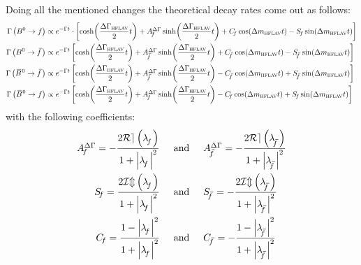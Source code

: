Doing all the mentioned changes the theoretical decay rates come out as follows:
\begin{align}
  \Gamma\left(\Bz\to f\right) &\propto e^{-\Gamma t} \cdot \left[
  \cosh\!\left(\frac{\DG_{\scaleto{\text{HFLAV}}{4pt}}}{2}t\right)+\ADGf\sinh\!\left(\frac{\DG_{\scaleto{\text{HFLAV}}{4pt}}}{2}t\right)
  +\Cf\cos\!\left(\dm_{\scaleto{\text{HFLAV}}{4pt}} t\right)-\Sf\sin\!\left(\dm_{\scaleto{\text{HFLAV}}{4pt}} t\right)\right] \label{eq:theodecrateHFLAV1}\\
  \Gamma\left(\Bz\to \fbar\right) &\propto e^{-\Gamma t}
  \left[\cosh\!\left(\frac{\DG_{\scaleto{\text{HFLAV}}{4pt}}}{2}t\right)+\ADGfbar\sinh\!\left(\frac{\DG_{\scaleto{\text{HFLAV}}{4pt}}}{2}t\right)
  +\Cfbar\cos\!\left(\dm_{\scaleto{\text{HFLAV}}{4pt}} t\right)
  -\Sfbar\sin\!\left(\dm_{\scaleto{\text{HFLAV}}{4pt}} t\right)\right]\label{eq:theodecrateHFLAV2}\\
  \Gamma\left(\Bzb\to \fbar\right) &\propto e^{-\Gamma t}
  \left[\cosh\!\left(\frac{\DG_{\scaleto{\text{HFLAV}}{4pt}}}{2}t\right)+\ADGfbar\sinh\!\left(\frac{\DG_{\scaleto{\text{HFLAV}}{4pt}}}{2}t\right)
  -\Cfbar\cos\!\left(\dm_{\scaleto{\text{HFLAV}}{4pt}} t\right)
  +\Sfbar\sin\!\left(\dm_{\scaleto{\text{HFLAV}}{4pt}} t\right)\right]\label{eq:theodecrateHFLAV3}\\
  \Gamma\left(\Bzb\to f\right) &\propto e^{-\Gamma t}
  \left[\cosh\!\left(\frac{\DG_{\scaleto{\text{HFLAV}}{4pt}}}{2}t\right)+\ADGf\sinh\!\left(\frac{\DG_{\scaleto{\text{HFLAV}}{4pt}}}{2}t\right)
  -\Cf\cos\!\left(\dm_{\scaleto{\text{HFLAV}}{4pt}} t\right)
  +\Sf\sin\!\left(\dm_{\scaleto{\text{HFLAV}}{4pt}} t\right)\right]\label{eq:theodecrateHFLAV4}
\end{align}
with the following \CP coefficients:
\begin{align}
  \ADGf = -\frac{2\mathcal{Re}\left(\Lf\right)}{1+\left|\Lf\right|^2} \hspace{0.5cm} &\text{and} \hspace{0.5cm}
  \ADGfbar = -\frac{2\mathcal{Re}\left(\Lfbar \right)}{1+\left|\Lfbar \right|^2}\nonumber\\
  \Sf = \frac{2\mathcal{Im}\left(\Lf\right)}{1+\left|\Lf\right|^2} \hspace{0.5cm} &\text{and} \hspace{0.5cm}
  \Sfbar = -\frac{2\mathcal{Im}\left(\Lfbar \right)}{1+\left|\Lfbar \right|^2}\nonumber\\
  \Cf = \frac{1-\left|\Lf\right|^2}{1+\left|\Lf\right|^2} \hspace{0.5cm} &\text{and} \hspace{0.5cm}
  \Cfbar = -\frac{1-\left|\Lfbar \right|^2}{1+\left|\Lfbar \right|^2}\nonumber
\end{align}
